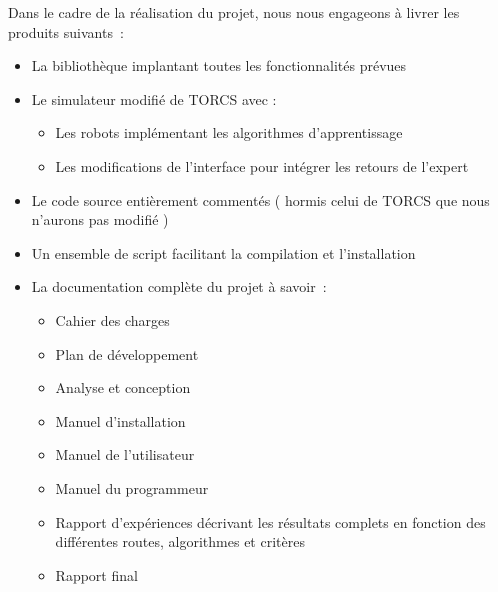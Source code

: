 \documentclass[a4paper,12pt]{article}
\begin{document}
  Dans le cadre de la réalisation du projet, nous nous engageons à livrer les produits suivants : 
  \begin{itemize}
   \item La bibliothèque implantant toutes les fonctionnalités prévues
   \item Le simulateur modifié de TORCS avec :
    \begin{itemize}
     \item Les robots implémentant les algorithmes d'apprentissage
     \item Les modifications de l'interface pour intégrer les retours de l'expert 
    \end{itemize}
   \item Le code source entièrement commentés ( hormis celui de TORCS que nous n'aurons pas modifié )
   \item Un ensemble de script facilitant la compilation et l'installation
   \item La documentation complète du projet à savoir :
    \begin{itemize}
      \item Cahier des charges
      \item Plan de développement
      \item Analyse et conception
      \item Manuel d’installation
      \item Manuel de l’utilisateur
      \item Manuel du programmeur
      \item Rapport d'expériences décrivant les résultats complets en fonction des différentes routes, algorithmes et critères
      \item Rapport final
    \end{itemize}
  \end{itemize}
  
  
  
\newpage
{}


\end{document}
